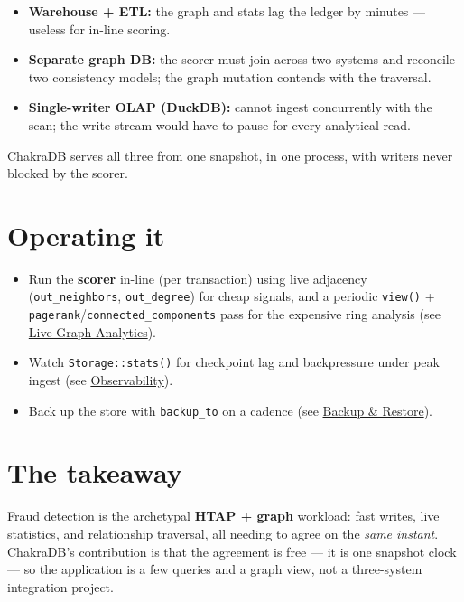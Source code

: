 \documentclass[
  11pt,
  openany]{book}
\providecommand{\tightlist}{%
  \setlength{\itemsep}{0pt}\setlength{\parskip}{0pt}}
\begin{document}
\begin{itemize}
\tightlist
\item
  \textbf{Warehouse + ETL:} the graph and stats lag the ledger by
  minutes --- useless for in-line scoring.
\item
  \textbf{Separate graph DB:} the scorer must join across two systems
  and reconcile two consistency models; the graph mutation contends with
  the traversal.
\item
  \textbf{Single-writer OLAP (DuckDB):} cannot ingest concurrently with
  the scan; the write stream would have to pause for every analytical
  read.
\end{itemize}

ChakraDB serves all three from one snapshot, in one process, with
writers never blocked by the scorer.

\section{Operating it}\label{operating-it}

\begin{itemize}
\tightlist
\item
  Run the \textbf{scorer} in-line (per transaction) using live adjacency
  (\texttt{out\_neighbors}, \texttt{out\_degree}) for cheap signals, and
  a periodic \texttt{view()} +
  \texttt{pagerank}/\texttt{connected\_components} pass for the
  expensive ring analysis (see \href{../graph/snapshot.md}{Live Graph
  Analytics}).
\item
  Watch \texttt{Storage::stats()} for checkpoint lag and backpressure
  under peak ingest (see
  \href{../getting-started/getting-started.md}{Observability}).
\item
  Back up the store with \texttt{backup\_to} on a cadence (see
  \href{../getting-started/getting-started.md}{Backup \& Restore}).
\end{itemize}

\section{The takeaway}\label{the-takeaway}

Fraud detection is the archetypal \textbf{HTAP + graph} workload: fast
writes, live statistics, and relationship traversal, all needing to
agree on the \emph{same instant}. ChakraDB's contribution is that the
agreement is free --- it is one snapshot clock --- so the application is
a few queries and a graph view, not a three-system integration project.
\end{document}
